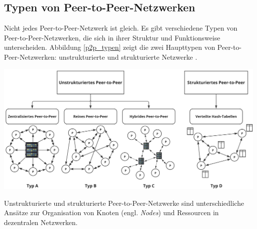 \subsection{Typen von Peer-to-Peer-Netzwerken}

Nicht jedes Peer-to-Peer-Netzwerk ist gleich. Es gibt verschiedene Typen von Peer-to-Peer-Netzwerken, die sich in ihrer Struktur und Funktionsweise unterscheiden. Abbildung \ref{p2p_typen} zeigt die zwei Haupttypen von Peer-to-Peer-Netzwerken: unstrukturierte und strukturierte Netzwerke \parencite[S. 362-363]{Luntovskyy_ModRechnernetze}.

\begin{center}
    \captionsetup{type=figure}
    \includegraphics[width=1\linewidth]{images/p2p_typen.png}
    \label{p2p_typen}
\end{center}

\noindent Unstrukturierte und strukturierte Peer-to-Peer-Netzwerke sind unterschiedliche Ansätze zur Organisation von Knoten (engl. \textit{Nodes}) und Ressourcen in dezentralen Netzwerken.

